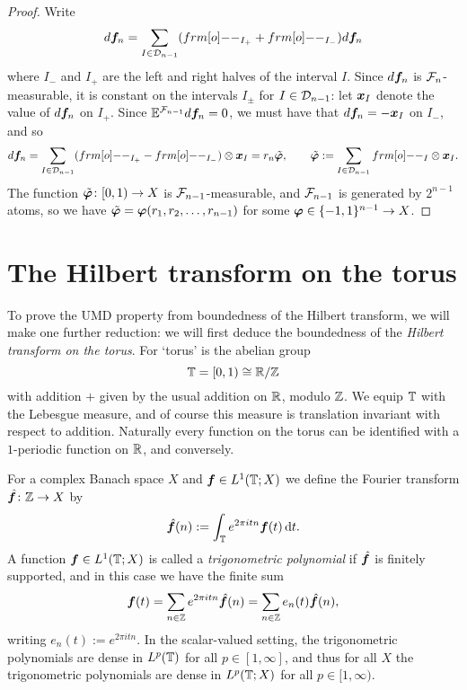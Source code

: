   \begin{proof}
    Write
    \begin{equation*}
      d\mb{f}_{n} = \sum_{I \in \mc{D}_{n-1}} (\1_{I_+} + \1_{I_{-}}) d\mb{f}_{n}
    \end{equation*}
    where $I_-$ and $I_+$ are the left and right halves of the interval $I$.
    Since $d\bm{f}_{n}$ is $\mathcal{F}_{n}$-measurable, it is constant on the intervals $I_\pm$ for $I \in \mathcal{D}_{n-1}$: let $\bm{x}_{I}$ denote the value of $d\bm{f}_{n}$ on $I_+$.
    Since $\mathbb{E}^{\mathcal{F}_{n-1}}d\bm{f}_{n} = 0$, we must have that $d\bm{f}_{n} = -\bm{x}_{I}$ on $I_{-}$, and so
    \begin{equation*}
      d\mb{f}_{n} = \sum_{I \in \mc{D}_{n-1}} (\1_{I_+} - \1_{I_{-}}) \otimes \mb{x}_{I} = r_{n} \tilde{\mb{\phi}}, \qquad \tilde{\mb{\phi}} := \sum_{I \in \mc{D}_{n-1}} \1_{I} \otimes \mb{x}_{I}.
    \end{equation*}
    The function $\tilde{\bm{\varphi}} \colon [0,1) \to X$ is $\mathcal{F}_{n-1}$-measurable, and $\mathcal{F}_{n-1}$ is generated by $2^{n-1}$ atoms, so we have $\tilde{\bm{\varphi}} = \bm{\varphi}(r_{1}, r_{2}, \ldots, r_{n-1})$ for some $\bm{\varphi} \in \{-1,1\}^{n-1} \to X$.
  \end{proof}


  \section{The Hilbert transform on the torus}

  To prove the UMD property from boundedness of the Hilbert transform, we will make one further reduction: we will first deduce the boundedness of the \emph{Hilbert transform on the torus}.
  For `torus' is the abelian group
  \begin{equation*}
    \mathbb{T} = [0,1) \cong \mathbb{R} / \mathbb{Z}
  \end{equation*}
  with addition $+$ given by the usual addition on $\mathbb{R}$, modulo $\mathbb{Z}$.
  We equip $\mathbb{T}$ with the Lebesgue measure, and of course this measure is translation invariant with respect to addition.
  Naturally every function on the torus can be identified with a $1$-periodic function on $\mathbb{R}$, and conversely.
  
  For a complex Banach space $X$ and $\bm{f} \in L^1(\mathbb{T};X)$ we define the Fourier transform $\hat{\bm{f}} \colon \mathbb{Z} \rightarrow X$ by
  \begin{equation*}
    \hat{\bm{f}}(n) := \int_{\mathbb{T}} e^{2\pi i t n} \bm{f}(t) \, \mathrm{d} t.
  \end{equation*}
  A function $\bm{f} \in L^1(\mathbb{T};X)$ is called a \emph{trigonometric polynomial} if $\hat{\bm{f}}$ is finitely supported, and in this case we have the finite sum
  \begin{equation}\label{eq:trigpoly}
    \bm{f}(t) = \sum_{n \in \mathbb{Z}} e^{2\pi i t n} \hat{\bm{f}}(n) = \sum_{n \in \mathbb{Z}} e_{n}(t) \hat{\bm{f}}(n),
  \end{equation}
  writing $e_{n}(t) := e^{2\pi i t n}$.
  In the scalar-valued setting, the trigonometric polynomials are dense in $L^p(\mathbb{T})$ for all $p \in [1,\infty]$, and thus for all $X$ the trigonometric polynomials are dense in $L^p(\mathbb{T};X)$ for all $p \in [1,\infty)$.

